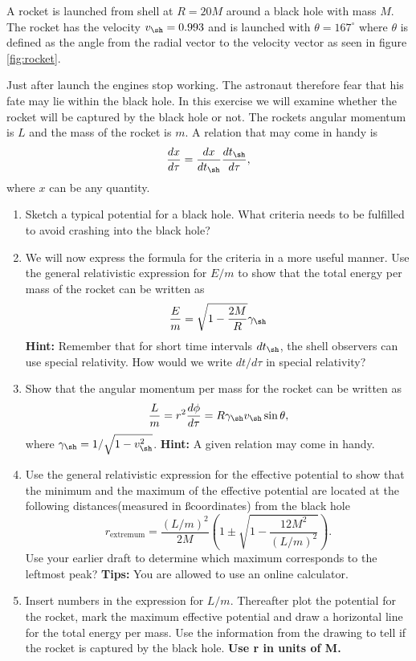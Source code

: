 {\begin{multicols}{2}
A rocket is launched from shell at $R=20M$ around a black hole with mass $M$. The rocket has the velocity $v_\sh=0.993$ and is launched with $\theta=167^\circ$ where $\theta$ is defined as the angle from the radial vector to the velocity vector as seen in figure \ref{fig:rocket}. 

Just after launch the engines stop working. The astronaut therefore fear that his fate may lie within the black hole. In this exercise we will examine whether the rocket will be captured by the black hole or not. The rockets angular momentum is $L$ and the mass of the rocket is $m$. A relation that may come in handy is
\[
\frac{dx}{d\tau}=\frac{dx}{dt_\sh}\frac{dt_\sh}{d\tau},
\]
where $x$ can be any quantity.
\begin{enumerate}
\item Sketch a typical potential for a black hole. What criteria needs to be fulfilled to avoid crashing into the black hole?
\item We will now express the formula for the criteria in a more useful manner. Use the general relativistic expression for $E/m$ to show that the total energy per mass of the rocket can be written as
\[
\frac{E}{m}=\sqrt{1-\frac{2M}{R}}\gamma_\sh
\]
{\bf Hint:} Remember that for short time intervals $dt_\sh$, the shell observers can use special relativity. How would we write $dt/d\tau$ in special relativity?

\item Show that the angular momentum per mass for the rocket can be written as
\[
\frac{L}{m}=r^2\frac{d\phi}{d\tau}=R\gamma_\sh v_\sh \sin\theta,
\]
where $\gamma_\sh=1/\sqrt{1-v_\sh^2}$. \textbf{Hint:} A given relation may come in handy.

\item Use the general relativistic expression for the effective potential to show that the minimum and the maximum of the effective potential are located at the following distances(measured in \ss coordinates) from the black hole
\[
r_\mathrm{extremum}=\frac{(L/m)^2}{2M}\left(1\pm\sqrt{1-\frac{12M^2}{(L/m)^2}}\right).
\]
Use your earlier draft to determine which maximum corresponds to the leftmost peak? \textbf{Tips:} You are allowed to use an online calculator.

\item Insert numbers in the expression for $L/m$. Thereafter plot the potential for the rocket, mark the maximum effective potential and draw a horizontal line for the total energy per mass. Use the information from the drawing to tell if the rocket is captured by the black hole. \textbf{Use r in units of M.}


\end{enumerate}
\end{multicols}}
